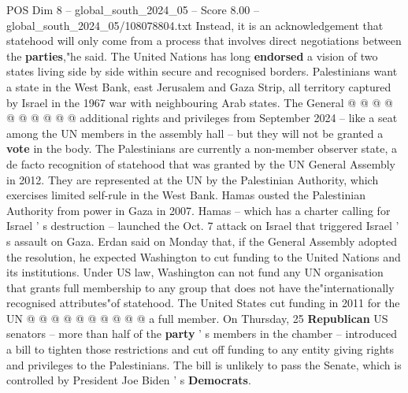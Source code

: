 \begin{textsample}{POS Dim 8 – global\_south\_2024\_05 – Score 8.00 – global\_south\_2024\_05/108078804.txt}
Instead, it is an acknowledgement that statehood will only come from a process that involves direct negotiations between the \textbf{parties},"he said.
The United Nations has long \textbf{endorsed} a vision of two states living side by side within secure and recognised borders.
Palestinians want a state in the West Bank, east Jerusalem and Gaza Strip, all territory captured by Israel in the 1967 war with neighbouring Arab states.
The General @ @ @ @ @ @ @ @ @ @ additional rights and privileges from September 2024 -- like a seat among the UN members in the assembly hall -- but they will not be granted a \textbf{vote} in the body.
The Palestinians are currently a non-member observer state, a de facto recognition of statehood that was granted by the UN General Assembly in 2012.
They are represented at the UN by the Palestinian Authority, which exercises limited self-rule in the West Bank.
Hamas ousted the Palestinian Authority from power in Gaza in 2007.
Hamas -- which has a charter calling for Israel ' s destruction -- launched the Oct. 7 attack on Israel that triggered Israel ' s assault on Gaza.
Erdan said on Monday that, if the General Assembly adopted the resolution, he expected Washington to cut funding to the United Nations and its institutions.
Under US law, Washington can not fund any UN organisation that grants full membership to any group that does not have the"internationally recognised attributes"of statehood.
The United States cut funding in 2011 for the UN @ @ @ @ @ @ @ @ @ @ a full member.
On Thursday, 25 \textbf{Republican} US senators -- more than half of the \textbf{party} ' s members in the chamber -- introduced a bill to tighten those restrictions and cut off funding to any entity giving rights and privileges to the Palestinians.
The bill is unlikely to pass the Senate, which is controlled by President Joe Biden ' s \textbf{Democrats}.

\end{textsample}
